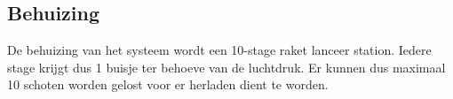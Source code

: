 \subsection{Behuizing}

De behuizing van het systeem wordt een 10-stage raket lanceer station. Iedere stage krijgt dus 1
buisje ter behoeve van de luchtdruk. Er kunnen dus maximaal 10 schoten worden gelost voor er
herladen dient te worden.
